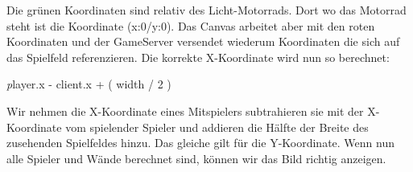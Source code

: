\documentclass[11pt,ngerman]{article}
\begin{document}
	Die grünen Koordinaten sind relativ des Licht-Motorrads. Dort wo das Motorrad steht ist die Koordinate (x:0/y:0). Das Canvas arbeitet aber mit den roten Koordinaten und der GameServer versendet wiederum Koordinaten die sich auf das Spielfeld referenzieren. Die korrekte X-Koordinate wird nun so berechnet:

	\begin{center}
	\textit player.x - client.x + ( width / 2 )
	\end{center}

	Wir nehmen die X-Koordinate eines Mitspielers subtrahieren sie mit der X-Koordinate vom spielender Spieler und addieren die Hälfte der Breite des zusehenden Spielfeldes hinzu. Das gleiche gilt für die Y-Koordinate. Wenn nun alle Spieler und Wände berechnet sind, können wir das Bild richtig anzeigen.
\end{document}
